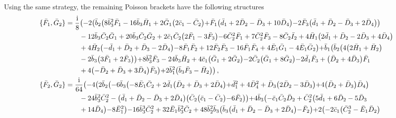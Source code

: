 \documentclass[10pt]{amsart}
\theoremstyle{definition}
\theoremstyle{corollary}
\theoremstyle{remark}
\theoremstyle{conclusion}
\begin{document}
Using the same strategy, the remaining Poisson brackets have the following structures
\begin{align}
\{\bar{F}_1, \bar{G}_2\}&=\frac{\rm i}{8}  \bigl(-2 \bigl(\bar{b}_2 \bigl(8 \bar{b}_3^2 \bar{F}_1-16 \bar{b}_3 \bar{H}_1+2 \bar{G}_1 \bigl(2 \bar{c}_1-\bar{C}_2\bigl)+\bar{F}_1 \bigl(\bar{d}_1+2 \bar{D}_2-\bar{D}_3+10 \bar{D}_4\bigl)-2 \bar{F}_3 \bigl(\bar{d}_1+\bar{D}_2-\bar{D}_3+2 \bar{D}_4\bigl)\bigl)\nonumber\\
&	\hskip 0.7cm	-12 \bar{b}_3 \bar{C}_2 \bar{G}_1+20 \bar{b}_3 \bar{C}_2 \bar{G}_2+2 \bar{c}_1 \bar{C}_2 \bigl(2 \bar{F}_1-3 \bar{F}_3\bigl)-6 \bar{C}_2^2 \bar{F}_1+7 \bar{C}_2^2 \bar{F}_3-8 \bar{C}_2 \bar{I}_2+4 \bar{H}_1 \bigl(2 \bar{d}_1+\bar{D}_2-2 \bar{D}_3+4 \bar{D}_4\bigl)\nonumber\\
&	\hskip 0.7cm+4 \bar{H}_2 \bigl(-\bar{d}_1+\bar{D}_2+\bar{D}_3-2 \bar{D}_4\bigl)-8 \bar{F}_1 \bar{F}_2+12 \bar{F}_2 \bar{F}_3-16 \bar{F}_1 \bar{F}_4+4 \bar{E}_1 \bar{G}_1-4 \bar{E}_1 \bar{G}_2\bigl)+\bar{b}_1 \bigl(\bar{b}_2 \bigl(4 \bigl(2 \bar{H}_1+\bar{H}_2\bigl)\nonumber\\
&	\hskip 0.7cm-2 \bar{b}_3 \bigl(3 \bar{F}_1+2 \bar{F}_3\bigl)\bigl)+8 \bar{b}_3^2 \bar{F}_3-24 \bar{b}_3 \bar{H}_2+4 \bar{c}_1 \bigl(\bar{G}_1+2 \bar{G}_2\bigl)-2 \bar{C}_2 \bigl(\bar{G}_1+8 \bar{G}_2\bigl)-2 \bar{d}_1 \bar{F}_3+\bigl(\bar{D}_2+4 \bar{D}_3\bigl) \bar{F}_1\nonumber\\
&	\hskip 0.7cm+4 \bigl(-\bar{D}_2+\bar{D}_3+3 \bar{D}_4\bigl) \bar{F}_3\bigl)+2 \bar{b}_1^2 \bigl(\bar{b}_3 \bar{F}_3-\bar{H}_2\bigl)\bigl) \, ,\nonumber\\
\{\bar{F}_2, \bar{G}_2\}&=\frac{{\rm i}}{64}  \bigl(-4 \bigl(2 \bar{b}_2 \bigl(-6 \bar{b}_3 \bigl(-8 \bar{E}_1 \bar{C}_2+2 \bar{d}_1 \bigl(\bar{D}_2+\bar{D}_3+2 \bar{D}_4\bigl)+\bar{d}_1^2+4 \bar{D}_4^2+\bar{D}_3 \bigl(2 \bar{D}_2-3 \bar{D}_3\bigl)+4 \bigl(\bar{D}_2+\bar{D}_3\bigl) \bar{D}_4\bigl)\nonumber\\
& \hskip 0.7cm-24 \bar{b}_3^2 \bar{C}_2^2-\bigl(\bar{d}_1+\bar{D}_2-\bar{D}_3+2 \bar{D}_4\bigl) \bigl(\bar{C}_2 \bigl(\bar{c}_1-\bar{C}_2\bigl)-6 \bar{F}_2\bigl)\bigl)+4 \bar{b}_3 \bigl(-\bar{c}_1 \bar{C}_2 \bar{D}_2+\bar{C}_2^2 \bigl(5 \bar{d}_1+6 \bar{D}_2-5 \bar{D}_3\nonumber\\
& \hskip 0.7cm	+14 \bar{D}_4\bigl)-8 \bar{E}_1^2\bigl)-16 \bar{b}_3^3 \bar{C}_2^2+32 \bar{E}_1 \bar{b}_3^2 \bar{C}_2+48 \bar{b}_2^2 \bar{b}_3 \bigl(\bar{b}_3 \bigl(\bar{d}_1+\bar{D}_2-\bar{D}_3+2 \bar{D}_4\bigl)-\bar{F}_2\bigl)+2 \bigl(-2 \bar{c}_1 \bigl(\bar{C}_2^3-\bar{E}_1 \bar{D}_2\bigl)\nonumber\\

\end{align}
\end{document}
